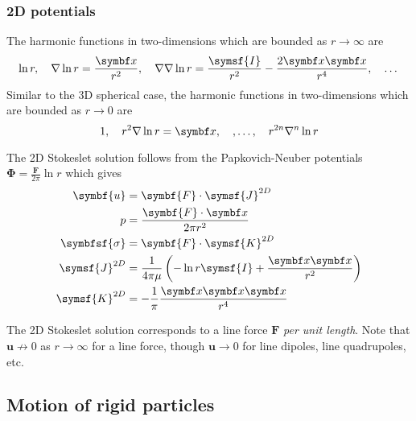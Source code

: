 \documentclass{jknotes}
\begin{document}
\subsubsection{2D potentials}
The harmonic functions in two-dimensions which are bounded as $r \to \infty$
are
\begin{equation}
	\ln r, \hspace{1em} \nabla \ln r = \frac{\x}{r^2}, \hspace{1em} \nabla
	\nabla \ln r = \frac{\symsf{I}}{r^2} - \frac{2\x\x}{r^4}, \hspace{1em}\dots
\end{equation}
Similar to the 3D spherical case, the harmonic functions in two-dimensions
which are bounded as $r \to 0$ are
\begin{equation}
	1, \hspace{1em} r^2\nabla \ln r = \x, \hspace{1em}, \dots, \hspace{1em}
	r^{2n} \nabla^n \ln r
\end{equation}

The 2D Stokeslet solution follows from the Papkovich-Neuber potentials
$\symbf{\Phi} = \frac{\symbf{F}}{2\pi} \ln r$ which gives
\begin{align}
	\symbf{u} &= \symbf{F}\cdot\symsf{J}^{2D} \\
	p &= \frac{\symbf{F}\cdot\x}{2\pi r^2} \\
	\symbfsf{\sigma} &= \symbf{F} \cdot \symsf{K}^{2D} \\
	\symsf{J}^{2D} &= \frac{1}{4\pi \mu} \left( -\ln r \symsf{I} +
	\frac{\x\x}{r^2}\right) \\
	\symsf{K}^{2D} &= -\frac{1}{\pi} \frac{\x\x\x}{r^4}
\end{align}

The 2D Stokeslet solution corresponds to a line force $\symbf{F}$ \emph{per unit
length}. Note that $\symbf{u} \not\rightarrow 0$ as $r \to \infty$ for a line force,
though $\symbf{u} \to 0$ for line dipoles, line quadrupoles, etc.

\subsection{Motion of rigid particles}
\end{document}
